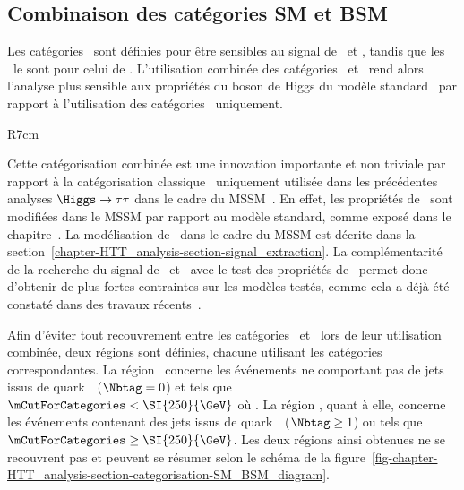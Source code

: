 \subsection{Combinaison des catégories SM et BSM}\label{chapter-HTT_analysis-section-categorisation-SM_and_BSM}
Les catégories \CATbsm\ sont définies pour être sensibles au signal de \Higgs\ et \HiggsA,
tandis que les \CATsm\ le sont pour celui de \higgs.
L'utilisation combinée des catégories \CATsm\ et \CATbsm\ rend alors l'analyse plus sensible aux propriétés du boson de Higgs du modèle standard \higgs\ par rapport à l'utilisation des catégories \CATbsm\ uniquement.
\begin{wrapfigure}{R}{7cm}
\centering

\caption{Définition des deux régions utilisant des catégories différentes.}
\label{fig-chapter-HTT_analysis-section-categorisation-SM_BSM_diagram}
\end{wrapfigure}
\par
Cette catégorisation combinée est une innovation importante et non triviale par rapport à la catégorisation classique \og \CATbsm\ uniquement \fg{} utilisée dans les précédentes analyses $\Higgs\to\tau\tau$ dans le cadre du MSSM~\cite{CMS-PAS-HIG-13-021,CMS-PAS-HIG-14-029,CMS-PAS-HIG-17-020}.
En effet, les propriétés de \higgs\ sont modifiées dans le MSSM par rapport au modèle standard, comme exposé dans le chapitre~.
La modélisation de \higgs\ dans le cadre du MSSM est décrite dans la section~\ref{chapter-HTT_analysis-section-signal_extraction}.
La complémentarité de la recherche du signal de \Higgs\ et \HiggsA\ avec le test des propriétés de \higgs\ permet donc d'obtenir de plus fortes contraintes sur les modèles testés, comme cela a déjà été constaté dans des travaux récents~\cite{Artur_thesis}.
\par
Afin d'éviter tout recouvrement entre les catégories \CATsm\ et \CATbsm\ lors de leur utilisation combinée, deux régions sont définies, chacune utilisant les catégories correspondantes.
La région \CATsm\ concerne les événements ne comportant pas de jets issus de quark~\quarkb\ ($\Nbtag=0$) et tels que $\mCutForCategories < \SI{250}{\GeV}$ où
\mCutForCategoriesdef.
La région \CATbsm, quant à elle, concerne les événements contenant des jets issus de quark~\quarkb\ ($\Nbtag\geq1$) ou tels que $\mCutForCategories \geq \SI{250}{\GeV}$.
Les deux régions ainsi obtenues ne se recouvrent pas et peuvent se résumer selon le schéma de la figure~\ref{fig-chapter-HTT_analysis-section-categorisation-SM_BSM_diagram}.
